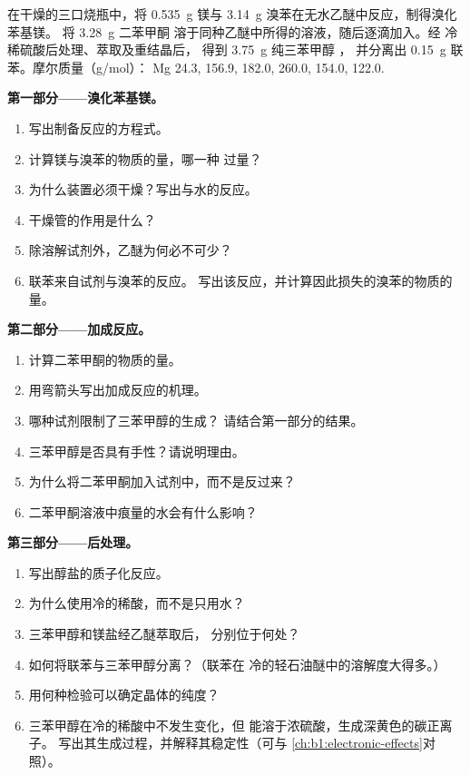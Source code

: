 \begin{problem}
\label{pb:b1:organomagnesium:1}
在干燥的三口烧瓶中，将 \qty{0.535}{g} 镁与
\qty{3.14}{g} 溴苯在无水乙醚中反应，制得溴化苯基镁。
将 \qty{3.28}{g} 二苯甲酮
 溶于同种乙醚中所得的溶液，随后逐滴加入。经
冷稀硫酸后处理、萃取及重结晶后，
得到 \qty{3.75}{g} 纯三苯甲醇 ，
并分离出 \qty{0.15}{g} 联苯。摩尔质量（\unit{g/mol}）：
Mg 24.3,  156.9,  182.0,  260.0,
 154.0,  122.0.

\medskip
\noindent\textbf{第一部分——溴化苯基镁。}
\begin{enumerate}
  \item 写出制备反应的方程式。
  \item 计算镁与溴苯的物质的量，哪一种
        过量？
  \item 为什么装置必须干燥？写出与水的反应。
  \item 干燥管的作用是什么？
  \item 除溶解试剂外，乙醚为何必不可少？
  \item 联苯来自试剂与溴苯的反应。
        写出该反应，并计算因此损失的溴苯的物质的量。
\end{enumerate}

\medskip
\noindent\textbf{第二部分——加成反应。}
\begin{enumerate}[resume]
  \item 计算二苯甲酮的物质的量。
  \item 用弯箭头写出加成反应的机理。
  \item 哪种试剂限制了三苯甲醇的生成？
        请结合第一部分的结果。
  \item 三苯甲醇是否具有手性？请说明理由。
  \item 为什么将二苯甲酮加入试剂中，而不是反过来？
  \item 二苯甲酮溶液中痕量的水会有什么影响？
\end{enumerate}

\medskip
\noindent\textbf{第三部分——后处理。}
\begin{enumerate}[resume]
  \item 写出醇盐的质子化反应。
  \item 为什么使用冷的稀酸，而不是只用水？
  \item 三苯甲醇和镁盐经乙醚萃取后，
        分别位于何处？
  \item 如何将联苯与三苯甲醇分离？（联苯在
        冷的轻石油醚中的溶解度大得多。）
  \item 用何种检验可以确定晶体的纯度？
  \item 三苯甲醇在冷的稀酸中不发生变化，但
        能溶于浓硫酸，生成深黄色的碳正离子。
        写出其生成过程，并解释其稳定性（可与
        \cref{ch:b1:electronic-effects}对照）。
\end{enumerate}


\end{problem}
